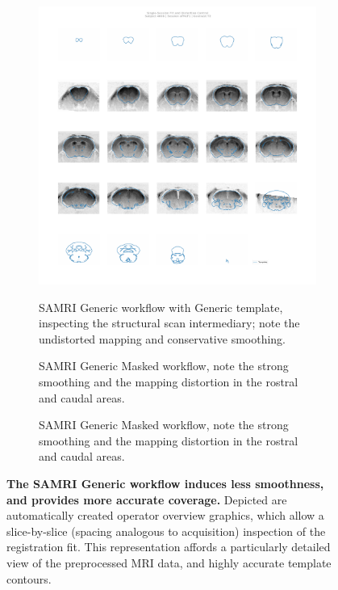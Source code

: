 \begin{figure}[h!]
\begin{subfigure}[t]{0.48\textwidth}
{			\includegraphics[width=\textwidth]{data/manual_overview/generic/4008_ofMcF1_T2w} 
			}
		\caption{
			SAMRI Generic workflow with Generic template, inspecting the structural scan intermediary; note the undistorted mapping and conservative smoothing.
			\vspace{1em}
			}
		\label{fig:fit_gga}
	\end{subfigure}
	\begin{subfigure}[t]{0.48\textwidth}
		\centering
		\setlength{\fboxsep}{0pt}%
		\setlength{\fboxrule}{0.2pt}%
		\caption{
			SAMRI Generic Masked workflow, note the strong smoothing and the mapping distortion in the rostral and caudal areas.
			}
		\label{fig:fit_ll}
	\end{subfigure}\hfill
	\begin{subfigure}[t]{0.48\textwidth}
		\centering
		\setlength{\fboxsep}{0pt}%
		\setlength{\fboxrule}{0.2pt}%
		\caption{
			SAMRI Generic Masked workflow, note the strong smoothing and the mapping distortion in the rostral and caudal areas.
			}
		\label{fig:fit_lg}
	\end{subfigure}
	\caption{
		\textbf{The SAMRI Generic workflow induces less smoothness, and provides more accurate coverage.}
		Depicted are automatically created operator overview graphics, which allow a slice-by-slice (spacing analogous to acquisition) inspection of the registration fit.
		This representation affords a particularly detailed view of the preprocessed MRI data, and highly accurate template contours.
		}
	\label{fig:fit}
\end{figure}

